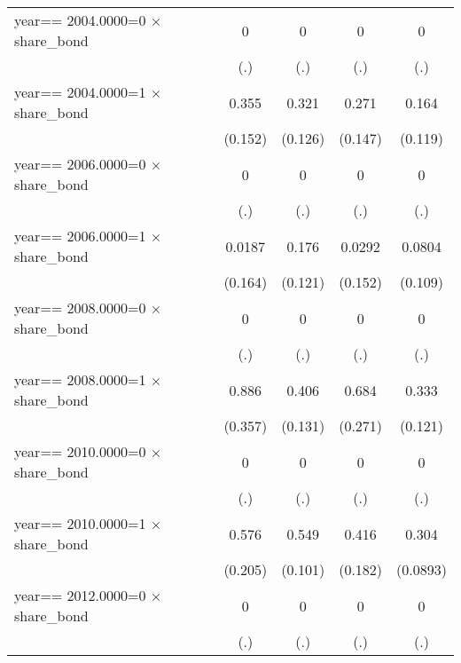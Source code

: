 \begin{table}[htbp]
\begin{tabular}{l*{4}{c}}
year==  2004.0000=0 $\times$ share\_bond&        0         &        0         &        0         &        0         \\
                &      (.)         &      (.)         &      (.)         &      (.)         \\
year==  2004.0000=1 $\times$ share\_bond&    0.355\sym{**} &    0.321\sym{**} &    0.271\sym{*}  &    0.164         \\
                &  (0.152)         &  (0.126)         &  (0.147)         &  (0.119)         \\
year==  2006.0000=0 $\times$ share\_bond&        0         &        0         &        0         &        0         \\
                &      (.)         &      (.)         &      (.)         &      (.)         \\
year==  2006.0000=1 $\times$ share\_bond&   0.0187         &    0.176         &   0.0292         &   0.0804         \\
                &  (0.164)         &  (0.121)         &  (0.152)         &  (0.109)         \\
year==  2008.0000=0 $\times$ share\_bond&        0         &        0         &        0         &        0         \\
                &      (.)         &      (.)         &      (.)         &      (.)         \\
year==  2008.0000=1 $\times$ share\_bond&    0.886\sym{**} &    0.406\sym{***}&    0.684\sym{**} &    0.333\sym{***}\\
                &  (0.357)         &  (0.131)         &  (0.271)         &  (0.121)         \\
year==  2010.0000=0 $\times$ share\_bond&        0         &        0         &        0         &        0         \\
                &      (.)         &      (.)         &      (.)         &      (.)         \\
year==  2010.0000=1 $\times$ share\_bond&    0.576\sym{***}&    0.549\sym{***}&    0.416\sym{**} &    0.304\sym{***}\\
                &  (0.205)         &  (0.101)         &  (0.182)         & (0.0893)         \\
year==  2012.0000=0 $\times$ share\_bond&        0         &        0         &        0         &        0         \\
                &      (.)         &      (.)         &      (.)         &      (.)         \\

\end{tabular}
\end{table}
